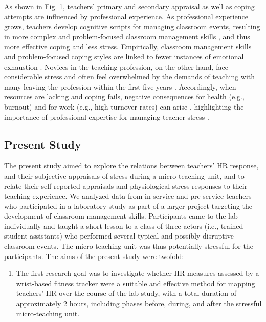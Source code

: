 \documentclass[preprint, 3p,
authoryear]{elsarticle} %
\providecommand{\tightlist}{%
  \setlength{\itemsep}{0pt}\setlength{\parskip}{0pt}}
\begin{document}
As shown in Fig. 1, teachers' primary and secondary appraisal as well as
coping attempts are influenced by professional experience. As
professional experience grows, teachers develop cognitive scripts for
managing classroom events, resulting in more complex and problem-focused
classroom management skills \citep{wolff2021classroom}, and thus more
effective coping and less stress. Empirically, classroom management
skills and problem-focused coping styles are linked to fewer instances
of emotional exhaustion \citep{maslach2001job, clunies2008self}. Novices
in the teaching profession, on the other hand, face considerable stress
and often feel overwhelmed by the demands of teaching
\citep{ophardt2017klassenmanagement, wolff2015keeping, klusmann2012berufliche}
with many leaving the profession within the first five years
\citep{ingersoll2003}. Accordingly, when resources are lacking and
coping fails, negative consequences for health (e.g., burnout) and for
work (e.g., high turnover rates) can arise
\citep{jalongo2006, unterbrink2007, aloe2014multivariate}, highlighting
the importance of professional expertise for managing teacher stress
\citep{fisher2011}.

\subsection{Present Study}\label{present-study}

The present study aimed to explore the relations between teachers' HR
response, and their subjective appraisals of stress during a
micro-teaching unit, and to relate their self-reported appraisals and
physiological stress responses to their teaching experience. We analyzed
data from in-service and pre-service teachers who participated in a
laboratory study as part of a larger project targeting the development
of classroom management skills. Participants came to the lab
individually and taught a short lesson to a class of three actors (i.e.,
trained student assistants) who performed several typical and possibly
disruptive classroom events. The micro-teaching unit was thus
potentially stressful for the participants. The aims of the present
study were twofold:

\begin{enumerate}
\def\labelenumi{(\arabic{enumi})}
\tightlist
\item
  The first research goal was to investigate whether HR measures
  assessed by a wrist-based fitness tracker were a suitable and
  effective method for mapping teachers' HR over the course of the lab
  study, with a total duration of approximately 2 hours, including
  phases before, during, and after the stressful micro-teaching unit.
\end{enumerate}
\end{document}
